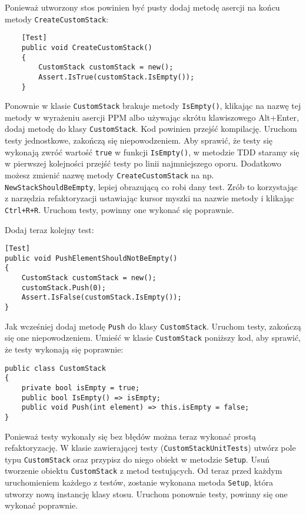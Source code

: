 Ponieważ utworzony stos powinien być pusty dodaj metodę asercji na końcu metody \texttt{CreateCustomStack}:
\begin{lstlisting}
	[Test]
	public void CreateCustomStack()
	{
		CustomStack customStack = new();
		Assert.IsTrue(customStack.IsEmpty());
	}
\end{lstlisting}
Ponownie w klasie \texttt{CustomStack} brakuje metody \texttt{IsEmpty()}, klikając na nazwę tej metody w wyrażeniu asercji PPM albo używając skrótu klawiszowego Alt+Enter, dodaj metodę do klasy \texttt{CustomStack}. Kod powinien przejść kompilację. Uruchom testy jednostkowe, zakończą się niepowodzeniem. Aby sprawić, że testy się wykonają zwróć wartość \texttt{true} w funkcji \texttt{IsEmpty()}, w metodzie TDD staramy się w pierwszej kolejności przejść testy po linii najmniejszego oporu. Dodatkowo możesz zmienić nazwę metody \texttt{CreateCustomStack} na np. \texttt{NewStackShouldBeEmpty}, lepiej obrazującą co robi dany test. Zrób to korzystając z narzędzia refaktoryzacji ustawiając kursor myszki na nazwie metody i klikając \texttt{Ctrl+R+R}. Uruchom testy, powinny one wykonać się poprawnie.

Dodaj teraz kolejny test:
\begin{lstlisting}
[Test]
public void PushElementShouldNotBeEmpty()
{
	CustomStack customStack = new();
	customStack.Push(0);
	Assert.IsFalse(customStack.IsEmpty());
}
\end{lstlisting}
Jak wcześniej dodaj metodę \texttt{Push} do klasy \texttt{CustomStack}. Uruchom testy, zakończą się one niepowodzeniem. Umieść w klasie \texttt{CustomStack} poniższy kod, aby sprawić, że testy wykonają się poprawnie:
\begin{lstlisting}
public class CustomStack
{
	private bool isEmpty = true;
	public bool IsEmpty() => isEmpty;
	public void Push(int element) => this.isEmpty = false;
}
\end{lstlisting}
Ponieważ testy wykonały się bez błędów można teraz wykonać prostą refaktoryzację. W klasie zawierającej testy (\texttt{CustomStackUnitTests}) utwórz pole typu \texttt{CustomStack} oraz przypisz do niego obiekt w metodzie \texttt{Setup}. Usuń tworzenie obiektu \texttt{CustomStack} z metod testujących. Od teraz przed każdym uruchomieniem każdego z testów, zostanie wykonana metoda \texttt{Setup}, która utworzy nową instancję klasy stosu. Uruchom ponownie testy, powinny się one wykonać poprawnie.

